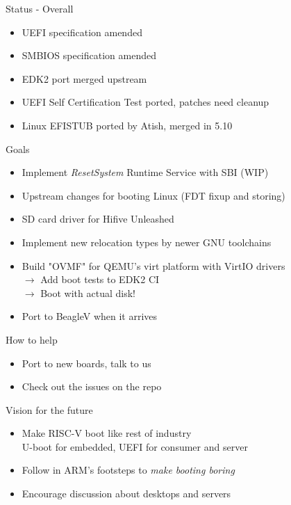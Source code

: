 \documentclass[
  10pt
]{beamer}
\begin{document}
\begin{frame}{Status - Overall}
  \begin{itemize}
    \item UEFI specification amended
    \item SMBIOS specification amended
    \item EDK2 port merged upstream
    \item UEFI Self Certification Test ported, patches need cleanup
    \item Linux EFISTUB ported by Atish, merged in 5.10
  \end{itemize}
\end{frame}

\begin{frame}{Goals}
  \begin{itemize}
    \item Implement \textit{ResetSystem} Runtime Service with SBI (WIP) %
    \item Upstream changes for booting Linux (FDT fixup and storing)
    \item SD card driver for Hifive Unleashed
    \item Implement new relocation types by newer GNU toolchains %
    \item Build "OVMF" for QEMU's virt platform with VirtIO drivers \\
          $\rightarrow$ Add boot tests to EDK2 CI \\
          $\rightarrow$ Boot with actual disk! \\
    \item Port to BeagleV when it arrives
  \end{itemize}
\end{frame}

\begin{frame}{How to help}
  \begin{itemize}
    \item Port to new boards, talk to us
    \item Check out the issues on the repo
  \end{itemize}
\end{frame}

\begin{frame}{Vision for the future}
  \begin{itemize}
    \item Make RISC-V boot like rest of industry \\
          U-boot for embedded, UEFI for consumer and server
    \item Follow in ARM's footsteps to \textit{make booting boring}
    \item Encourage discussion about desktops and servers
  \end{itemize}
\end{frame}
\end{document}
